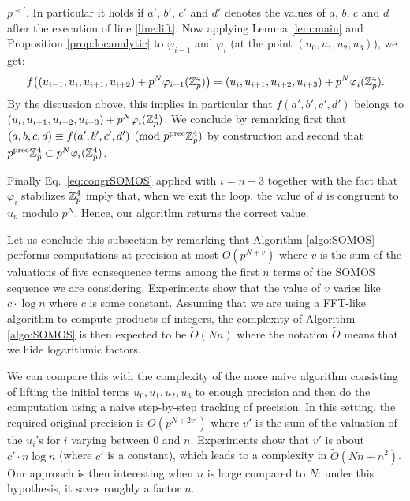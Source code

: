 \documentclass{lms}
\begin{document}
$p^{\prec'}$. In particular it holds if $a'$, $b'$, $c'$ and $d'$ denotes
the values of $a$, $b$, $c$ and $d$ after the execution of line
\ref{line:lift}. Now applying Lemma \ref{lem:main} and Proposition
\ref{prop:locanalytic} to $\varphi_{i-1}$ and $\varphi_i$ (at the point 
$(u_0, u_1, u_2, u_3)$), we get:
$$f\big((u_{i-1}, u_i, u_{i+1}, u_{i+2}) + p^N \varphi_{i-1}(\mathbb Z_p^4)\big)
= (u_i, u_{i+1}, u_{i+2}, u_{i+3}) + p^N \varphi_i(\mathbb Z_p^4).$$
By the discussion above, this implies in particular that $f(a',b',c',d')$
belongs to $(u_i, u_{i+1}, u_{i+2}, u_{i+3}) + p^N \varphi_i(\mathbb Z_p^4)$. We
conclude by remarking first that $(a,b,c,d) \equiv f(a',b',c',d') \pmod 
{p^{\text{\rm prec}} \mathbb Z_p^4}$ by construction and second that $p^{\text{\rm prec}} \mathbb Z_p^4 \subset
p^N \varphi_i(\mathbb Z_p^4)$.

Finally Eq.~\eqref{eq:congrSOMOS} applied with $i = n-3$ together with
the fact that $\varphi_i$ stabilizes $\mathbb Z_p^4$ imply that, when we exit
the loop, the value of $d$ is congruent to $u_n$ modulo $p^N$. Hence,
our algorithm returns the correct value.

\medskip

Let us conclude this subsection by remarking that Algorithm 
\ref{algo:SOMOS} performs computations at precision at most $O(p^{N+v})$ 
where $v$ is the sum of the valuations of five consequence terms among 
the first $n$ terms of the SOMOS sequence we are considering. 
Experiments show that the value of $v$ varies like $c \cdot \log n$ 
where $c$ is some constant. Assuming that we are using a FFT-like 
algorithm to compute products of integers, the complexity of Algorithm 
\ref{algo:SOMOS} is then expected to be $\tilde O(N n)$ where the 
notation $\tilde O$ means that we hide logarithmic factors.

We can compare this with the complexity of the more naive algorithm 
consisting of lifting the initial terms $u_0, u_1, u_2, u_3$ to enough 
precision and then do the computation using a naive step-by-step 
tracking of precision. In this setting, the required original precision 
is $O(p^{N+2v'})$ where $v'$ is the sum of the valuation of the $u_i$'s 
for $i$ varying between $0$ and $n$. Experiments show that $v'$ is about 
$c' \cdot n \log n$ (where $c'$ is a constant), which leads to a 
complexity in $\tilde O (N n + n^2)$. Our approach is then interesting
when $n$ is large compared to $N$: under this hypothesis, it saves
roughly a factor $n$.

\end{document}
